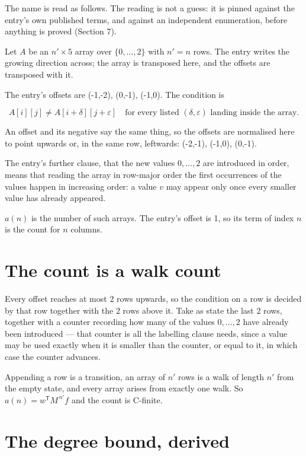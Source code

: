 \documentclass[11pt]{article}
\theoremstyle{definition}
\begin{document}
The name is read as follows. The reading is not a guess: it is pinned against the entry's own published terms, and against an independent enumeration, before anything is proved (Section 7).

Let $A$ be an $n' \times 5$ array over $\{0,\dots,2\}$ with $n' = n$ rows. The entry writes the growing direction across; the array is transposed here, and the offsets are transposed with it.

The entry's offsets are (-1,-2), (0,-1), (-1,0). The condition is

\[A[i][j] \ne A[i{+}\delta][j{+}\varepsilon]\quad\text{for every listed }(\delta,\varepsilon)\text{ landing inside the array.}\]

An offset and its negative say the same thing, so the offsets are normalised here to point upwards or, in the same row, leftwards: (-2,-1), (-1,0), (0,-1).

The entry's further clause, that the new values $0,\dots,2$ are introduced in order, means that reading the array in row-major order the first occurrences of the values happen in increasing order: a value $v$ may appear only once every smaller value has already appeared.

$a(n)$ is the number of such arrays. The entry's offset is 1, so its term of index $n$ is the count for $n$ columns.

\section{The count is a walk count}

Every offset reaches at most $2$ rows upwards, so the condition on a row is decided by that row together with the $2$ rows above it. Take as state the last $2$ rows, together with a counter recording how many of the values $0,\dots,2$ have already been introduced --- that counter is all the labelling clause needs, since a value may be used exactly when it is smaller than the counter, or equal to it, in which case the counter advances.

Appending a row is a transition, an array of $n'$ rows is a walk of length $n'$ from the empty state, and every array arises from exactly one walk. So $a(n) = w^{\mathsf T}M^{\,n'}f$ and the count is C-finite.

\section{The degree bound, derived}
\end{document}
